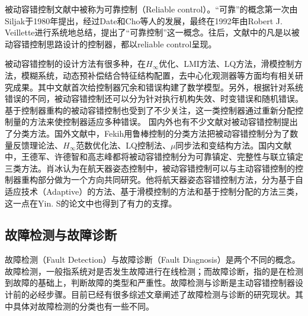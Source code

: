 被动容错控制文献中被称为可靠控制（Reliable control）。“可靠”的概念第一次由Siljak于1980年提出\cite{siljak1980}，经过Date和Cho等人的发展\cite{70346,4790503}，最终在1992年由Robert J. Veillette进行系统地总结\cite{119629}，提出了“可靠控制”这一概念。往后，文献中的凡是以被动容错控制思路设计的控制器，都以reliable control呈现。

被动容错控制的设计方法有很多种，在$H_\infty$优化\cite{119629,7850999}、LMI方法\cite{7795198,974340,1236798}、LQ方法\cite{VEILLETTE1995137,847106,866928}，滑模控制方法\cite{4160860}，模糊系统\cite{7795198,7505963,Zha20173267}，动态预补偿结合特征结构配置\cite{Jiang2000Design,ZHAO19981267}，去中心化观测器\cite{70346}等方面均有相关研究成果。其中文献\cite{ZHAO19981267}首次给控制器冗余和错误构建了数学模型。另外，根据针对系统错误的不同，被动容错控制还可以分为针对执行机构失效\cite{ZHAO19981267,974340,VEILLETTE1995137,1236798,Tian20101907,Li20132455,7353144,7863042,70346,866928}、时变错误\cite{7850999,CHEN2004349,6064886}和随机错误\cite{7795198,7505963,5540530,Zha20173267}。基于控制器重构的被动容错控制也受到了不少关注\cite{6859271}，这一类控制器通过重新分配控制量的方法来使控制器适应多种错误。
国内外也有不少文献对被动容错控制提出了分类方法。国外文献中，Fekih\cite{6859271}用鲁棒控制的分类方法把被动容错控制分为了数量反馈理论法、$H_\infty$范数优化法\cite{4079591}、LQ控制法\cite{Staroswiecki20072070}、$\mu$同步法和变结构方法。国内文献中，王德军\cite{wangdejun2014}、许德智\cite{xudezhi2013}和高志峰\cite{gaozhifeng2011}都将被动容错控制分为可靠镇定、完整性与联立镇定三类方法。肖冰\cite{xiaobing2014}认为在航天器姿态控制中，被动容错控制可以与主动容错控制的控制器重构部分做为一个方向共同研究。他将航天器姿态容错控制方法，分为基于自适应技术（Adaptive）的方法、基于滑模控制的方法和基于控制分配的方法三类，这一点在Yin. S的论文中\cite{7407616}也得到了有力的支撑。

\subsection{故障检测与故障诊断}\label{subsec:fdd}

故障检测（Fault Detection）与故障诊断（Fault Diagnosis）是两个不同的概念。故障检测，一般指系统对是否发生故障进行在线检测；而故障诊断，指的是在检测到故障的基础上，判断故障的类型和严重性。故障检测与诊断是主动容错控制器设计前的必经步骤。目前已经有很多综述文章阐述了故障检测与诊断的研究现状\cite{Venkatasubramanian2003293,6859271,Zhang2008229,7407616,6423903,Marzat2012modelbased,Jiang201260,5282515,Venkatasubramanian2003293,Venkatasubramanian2003A}。其中具体对故障检测的分类也有一些不同。

